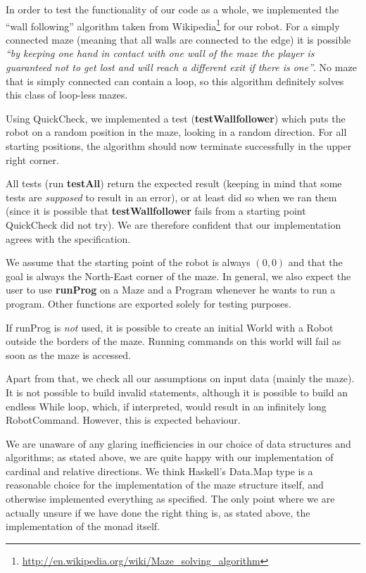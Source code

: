 \documentclass[a4paper]{article}
\begin{document}
In order to test the functionality of our code as a whole, we implemented the ``wall following'' algorithm taken from
Wikipedia\footnote{\url{http://en.wikipedia.org/wiki/Maze_solving_algorithm}} for our robot.
For a simply connected maze (meaning that all walls are
connected to the edge) it is possible \emph{``by keeping one hand in
  contact with one wall of the maze the player is guaranteed not to
  get lost and will reach a different exit if there is one''}. No maze
that is simply connected can contain a loop, so this algorithm
definitely solves this class of loop-less mazes. 

Using QuickCheck, we implemented a test (\textbf{testWallfollower}) which puts the robot on a random position in the maze, looking in a random direction. For all starting positions, the algorithm should now terminate successfully in the upper right corner. 

All tests (run \textbf{testAll}) return the expected result (keeping in mind that some tests are \emph{supposed} to result in an error), or at least did so when we ran them (since it is possible that \textbf{testWallfollower} fails from a starting point QuickCheck did not try). We are therefore confident that our implementation agrees with the specification.

We assume that the starting point of the robot is always $(0,0)$ and that the goal is always the North-East corner of the maze. In general, we also expect the user to use \textbf{runProg} on a Maze and a Program whenever he wants to run a program. Other functions are exported solely for testing purposes. 

If runProg is \emph{not} used, it is possible to create an initial World with a Robot outside the borders of the maze. Running commands on this world will fail as soon as the maze is accessed.

Apart from that, we check all our assumptions on input data (mainly the maze). It is not possible to build invalid statements, although it is possible to build an endless While loop, which, if interpreted, would result in an infinitely long RobotCommand. However, this is expected behaviour.

We are unaware of any glaring inefficiencies in our choice of data structures and algorithms; as stated above, we are quite happy with our implementation of cardinal and relative directions. We think Haskell's Data.Map type is a reasonable choice for the implementation of the maze structure itself, and otherwise implemented everything as specified. The only point where we are actually unsure if we have done the right thing is, as stated above, the implementation of the monad itself. 
\end{document}
